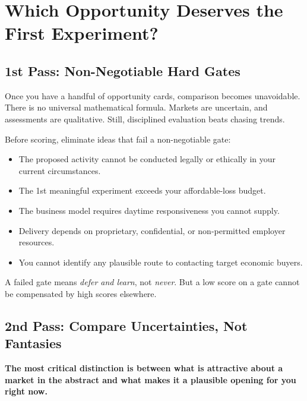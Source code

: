 \section{Which Opportunity Deserves the First Experiment?}

\subsection{1st Pass: Non-Negotiable Hard Gates}

Once you have a handful of opportunity cards, comparison becomes unavoidable. There is no universal mathematical formula. Markets are uncertain, and assessments are qualitative. Still, disciplined evaluation beats chasing trends.

Before scoring, eliminate ideas that fail a non-negotiable gate:

\begin{itemize}[leftmargin=11pt,itemsep=1.5pt,topsep=1.5pt,parsep=0pt]
  \item The proposed activity cannot be conducted legally or ethically in your current circumstances.
  \item The 1st meaningful experiment exceeds your affordable-loss budget.
  \item The business model requires daytime responsiveness you cannot supply.
  \item Delivery depends on proprietary, confidential, or non-permitted employer resources.
  \item You cannot identify any plausible route to contacting target economic buyers.
\end{itemize}

A failed gate means \textit{defer and learn}, not \textit{never}. But a low score on a gate cannot be compensated by high scores elsewhere.

\subsection{2nd Pass: Compare Uncertainties, Not Fantasies}

\textbf{The most critical distinction is between what is attractive about a market in the abstract and what makes it a plausible opening for you right now.}

